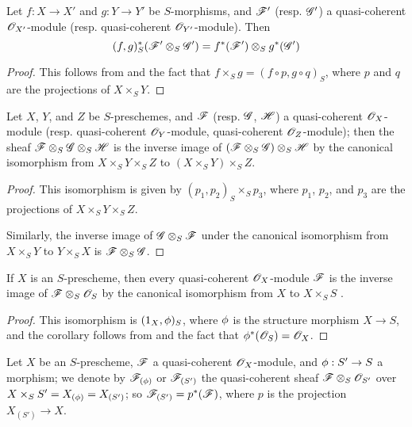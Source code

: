 \begin{corollary}[9.1.5]
\label{1.9.1.5}
Let $f:X\to X'$ and $g:Y\to Y'$ be
$S$-morphisms, and $\mathscr{F}'$ (resp. $\mathscr{G}'$) a quasi-coherent
$\mathscr{O}_{X'}$-module (resp. quasi-coherent $\mathscr{O}_{Y'}$-module). Then
\[
  (f,g)^*_S(\mathscr{F}'\otimes_S\mathscr{G}')=f^*(\mathscr{F}')\otimes_S g^*(\mathscr{G}')
\]
\end{corollary}

\begin{proof}
\label{proof-1.9.1.5}
This follows from  and the fact that $f\times_S g=(f\circ p, g\circ q)_S$,
where $p$ and $q$ are the projections of $X\times_S Y$.
\end{proof}

\begin{corollary}[9.1.6]
\label{1.9.1.6}
Let $X$, $Y$, and $Z$ be $S$-preschemes, and $\mathscr{F}$ (resp. $\mathscr{G}$, $\mathscr{H}$) a
quasi-coherent $\mathscr{O}_X$-module (resp. quasi-coherent $\mathscr{O}_Y$-module, quasi-coherent
$\mathscr{O}_Z$-module); then the sheaf $\mathscr{F}\otimes_S\mathscr{G}\otimes_S\mathscr{H}$ is the inverse image
of $(\mathscr{F}\otimes_S\mathscr{G})\otimes_S\mathscr{H}$ by the canonical isomorphism from
$X\times_S Y\times_S Z$ to $(X\times_S Y)\times_S Z$.
\end{corollary}

\begin{proof}
\label{proof-1.9.16}
This isomorphism is given by $(p_1,p_2)_S\times_S p_3$, where $p_1$, $p_2$, and $p_3$
are the projections of $X\times_S Y\times_S Z$.

Similarly, the inverse image of $\mathscr{G}\otimes_S\mathscr{F}$ under the canonical isomorphism from
$X\times_S Y$ to $Y\times_S X$ is $\mathscr{F}\otimes_S\mathscr{G}$.
\end{proof}

\begin{corollary}[9.1.7]
\label{1.9.1.7}
If $X$ is an $S$-prescheme, then every quasi-coherent $\mathscr{O}_X$-module $\mathscr{F}$ is the inverse
image of $\mathscr{F}\otimes_S\mathscr{O}_S$ by the canonical isomorphism from $X$ to $X\times_S S$
.
\end{corollary}

\begin{proof}
\label{proof-1.9.1.7}
This isomorphism is $(1_X,\phi)_S$, where $\phi$ is the structure morphism
$X\to S$, and the corollary follows from  and the fact that
$\phi^*(\mathscr{O}_S)=\mathscr{O}_X$.
\end{proof}

\begin{env}[9.1.8]
\label{1.9.1.8}
Let $X$ be an $S$-prescheme, $\mathscr{F}$ a quasi-coherent
$\mathscr{O}_X$-module, and $\vphi:S'\to S$ a morphism; we denote by
$\mathscr{F}_{(\phi)}$ or $\mathscr{F}_{(S')}$ the quasi-coherent sheaf
$\mathscr{F}\otimes_S\mathscr{O}_{S'}$ over $X\times_S S'=X_{(\phi)}=X_{(S')}$; so
$\mathscr{F}_{(S')}=p^*(\mathscr{F})$, where $p$ is the projection $X_{(S')}\to X$.
\end{env}

